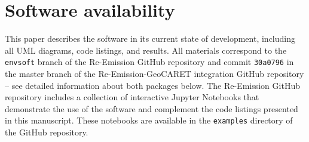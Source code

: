 \documentclass[review, authoryear, 1p]{elsarticle} %
\begin{document}

\section{Software availability}
\label{sec:software_availability}
This paper describes the software in its current state of development, including all UML diagrams, code listings, and results.
All materials correspond to the \texttt{envsoft} branch of the Re-Emission GitHub repository and commit \texttt{30a0796} in the master branch of the Re-Emission-GeoCARET integration GitHub repository -- see detailed information about both packages below.
The Re-Emission GitHub repository includes a collection of interactive Jupyter Notebooks that demonstrate the use of the software and complement the code listings presented in this manuscript.
These notebooks are available in the \texttt{examples} directory of the GitHub repository.
\end{document}
